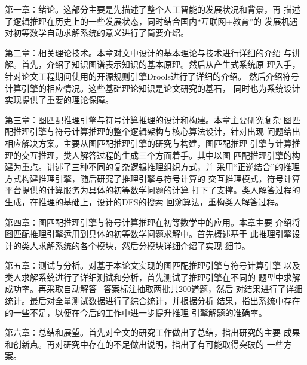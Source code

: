 \documentclass{standalone}
\begin{document}
第一章：绪论。这部分主要是先描述了整个人工智能的发展状况和背景，再
描述了逻辑推理在历史上的一些发展状态，同时结合国内“互联网+教育”的
发展机遇对初等数学自动求解系统的意义进行了简要介绍。

第二章：相关理论技术。本章对文中设计的基本理论与技术进行详细的介绍
与讲解。首先，介绍了知识图谱表示知识的基本原理。然后从产生式系统原
理入手，针对论文工程期间使用的开源规则引擎Drools进行了详细的介绍。
然后介绍符号计算引擎的相应情况。这些基础理论知识是论文研究的基石，
同时也为系统设计实现提供了重要的理论保障。

第三章：图匹配推理引擎与符号计算推理的设计和构建。本章主要研究复杂
图匹配推理引擎与符号计算推理的整个逻辑架构与核心算法设计，针对出现
问题给出相应解决方案。主要从图匹配推理引擎的研究与构建，图匹配推理
引擎与计算推理的交互推理，类人解答过程的生成三个方面着手。其中以图
匹配推理引擎的构建为重点。讲述了三种不同的复杂逻辑推理组织方式，并
采用“正逆结合”的推理方式构建推理引擎，随后研究了推理引擎与符号计算的
交互推理模式，符号计算平台提供的计算服务为具体的初等数学问题的计算
打下了支撑。类人解答过程的生成，在推理的基础上，设计的DFS的搜索
回溯算法，重构类人解答过程。

第四章：图匹配推理引擎与符号计算推理在初等数学中的应用。本章主要
介绍将图匹配推理引擎运用到具体的初等数学问题求解中。首先概述基于
此推理引擎设计的类人求解系统的各个模块，然后分模块详细介绍了实现
细节。

第五章：测试与分析。对基于本论文实现的图匹配推理引擎与符号计算引擎
以及类人求解系统进行了详细测试和分析，首先测试了推理引擎在不同的
题型中求解成功率。再采取自动解答+答案标注抽取两批共200道题，然后
对结果进行了详细统计。最后对全量测试数据进行了综合统计，并根据分析
结果，指出系统中存在的一些不足，以便在今后的工作中进一步提升推理
引擎解题的准确率。

第六章：总结和展望。首先对全文的研究工作做出了总结，指出研究的主要
成果和创新点。再对研究中存在的不足做出说明，指出了有可能取得突破的
一些方案。
\end{document}
